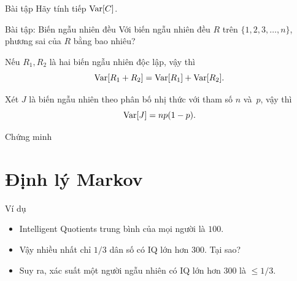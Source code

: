 \begin{frame}{Bài tập}
	Hãy tính tiếp $\mathrm{Var}[C]$.
\end{frame}

\begin{frame}{Bài tập: Biến ngẫu nhiên đều}
	Với biến ngẫu nhiên đều $R$ trên $\{1,2,3, \dots, n\}$, phương sai của $R$ bằng bao nhiêu?
	
\end{frame}
\begin{frame}
\begin{thrm}
Nếu $R_1, R_2$ là hai biến ngẫu nhiên \alert{độc lập}, vậy thì 
\[
	\mathrm{Var}[R_1 + R_2] = \mathrm{Var}[R_1] + \mathrm{Var}[R_2].
\] 	
\end{thrm}
	
\end{frame}

\begin{frame}%
	\begin{lmm}
	Xét $J$ là biến ngẫu nhiên theo phân bố nhị thức với tham số $n$ và~$p$, vậy thì 
	\[
		\mathrm{Var}[J] = n p(1-p).
	\] 		
	\end{lmm}\pause
	\begin{block}{Chứng minh}
		 \action<+->{Đặt 
		\[
			J_i = 1\quad  \Leftrightarrow\quad \text{ đồng thứ $i$ ngửa}  
		\]
		\vspace{-0.5cm}}
	
		\vspace{-0.5cm}
		
	\end{block}
\end{frame}

\section{Định lý Markov}
\begin{frame}{Ví dụ}
	\begin{itemize}
		\item<+-> \alert{I}ntelligent \alert{Q}uotients trung bình của mọi người là $100$.
		\item<+-> Vậy nhiều nhất chỉ $1/3$ dân số có IQ lớn hơn $300$. Tại sao?
		\item<+-> Suy ra,  xác suất một người ngẫu nhiên có IQ lớn hơn $300$ là $\leq 1/3$.  
	\end{itemize}
\end{frame}

